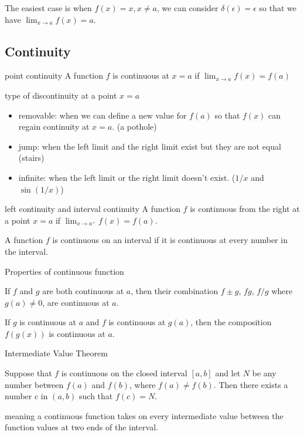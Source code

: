 \documentclass[Calculus 1 Recitation.tex]{subfiles}
\begin{document}
The easiest case is when $f(x)=x, x\neq a$, we can consider $\delta(\epsilon)=\epsilon$ so that we have $\lim_{x\to a} f(x)=a$.

\subsection{Continuity}

\begin{myleftlinebox}
	point continuity
	\tcblower
	A function $f$ is continuous at $x=a$ if $\lim_{x\to a} f(x) = f(a)$
\end{myleftlinebox}

\begin{myleftlinebox}
	type of discontinuity at a point $x=a$
	\tcblower
	\begin{itemize}
		\item removable: when we can define a new value for $f(a)$ so that $f(x)$ can regain continuity at $x=a$. (a pothole)
		\item jump: when the left limit and the right limit exist but they are not equal (stairs)
		\item infinite: when the left limit or the right limit doesn't exist. ($1/x$ and $\sin(1/x)$)
	\end{itemize}
\end{myleftlinebox}

\begin{myleftlinebox}
	left continuity and interval continuity
	\tcblower
	A function $f$ is continuous from the right at a point $x=a$ if $\lim_{x\to a^+} f(x) = f(a)$.

	A function $f$ is continuous on an interval if it is continuous at every number in the interval.
\end{myleftlinebox}

\begin{myleftlinebox}
	Properties of continuous function
	\tcblower
	\begin{theorem}\label{thm:continFunc}
		If $f$ and $g$ are both continuous at $a$, then their combination $f\pm g$, $fg$, $f/g$ where $g(a)\neq 0$, are continuous at $a$.

		If $g$ is continuous at $a$ and $f$ is continuous at $g(a)$, then the composition $f(g(x))$ is continuous at $a$.
	\end{theorem}
\end{myleftlinebox}

\begin{myleftlinebox}
	Intermediate Value Theorem
	\tcblower
	\begin{theorem}\label{thm:intermediateValue}
		Suppose that $f$ is continuous on the closed interval $[a, b]$ and let $N$ be any number between $f(a)$ and $f(b)$, where $f(a) \neq f(b)$. Then there exists a number c in $(a, b)$ such that $f(c) = N$.
	\end{theorem}
	meaning a continuous function takes on every intermediate value between the function values at two ends of the interval.
\end{myleftlinebox}
\end{document}
